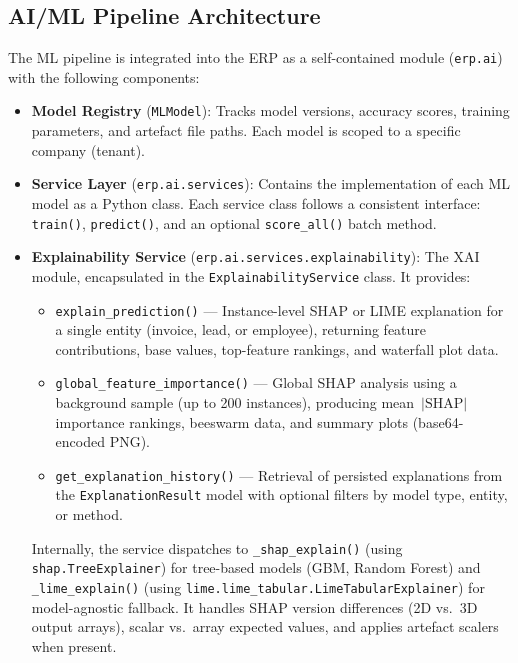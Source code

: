 \documentclass[12pt,a4paper]{report}
\begin{document}
\subsection{AI/ML Pipeline Architecture}

The ML pipeline is integrated into the ERP as a self-contained module (\texttt{erp.ai}) with the following components:

\begin{itemize}
  \item \textbf{Model Registry} (\texttt{MLModel}): Tracks model versions, accuracy scores, training parameters, and artefact file paths. Each model is scoped to a specific company (tenant).

  \item \textbf{Service Layer} (\texttt{erp.ai.services}): Contains the implementation of each ML model as a Python class. Each service class follows a consistent interface: \texttt{train()}, \texttt{predict()}, and an optional \texttt{score\_all()} batch method.

  \item \textbf{Explainability Service} (\texttt{erp.ai.services.explainability}): The XAI module, encapsulated in the \texttt{ExplainabilityService} class.  It provides:
  \begin{itemize}
    \item \texttt{explain\_prediction()} --- Instance-level SHAP or LIME explanation for a single entity (invoice, lead, or employee), returning feature contributions, base values, top-feature rankings, and waterfall plot data.
    \item \texttt{global\_feature\_importance()} --- Global SHAP analysis using a background sample (up to 200 instances), producing mean~$|\text{SHAP}|$ importance rankings, beeswarm data, and summary plots (base64-encoded PNG).
    \item \texttt{get\_explanation\_history()} --- Retrieval of persisted explanations from the \texttt{ExplanationResult} model with optional filters by model type, entity, or method.
  \end{itemize}
  Internally, the service dispatches to \texttt{\_shap\_explain()} (using \texttt{shap.TreeExplainer}) for tree-based models (GBM, Random Forest) and \texttt{\_lime\_explain()} (using \texttt{lime.lime\_tabular.LimeTabularExplainer}) for model-agnostic fallback. It handles SHAP version differences (2D vs.\ 3D output arrays), scalar vs.\ array expected values, and applies artefact scalers when present.


\end{itemize}
\end{document}
